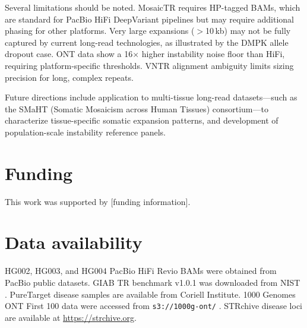 \documentclass[12pt]{article}
\begin{document}
Several limitations should be noted.
MosaicTR requires HP-tagged BAMs, which are standard for PacBio HiFi DeepVariant pipelines but may require additional phasing for other platforms.
Very large expansions ($>$10\,kb) may not be fully captured by current long-read technologies, as illustrated by the DMPK allele dropout case.
ONT data show a 16$\times$ higher instability noise floor than HiFi, requiring platform-specific thresholds.
VNTR alignment ambiguity limits sizing precision for long, complex repeats.

Future directions include application to multi-tissue long-read datasets---such as the SMaHT (Somatic Mosaicism across Human Tissues) consortium---to characterize tissue-specific somatic expansion patterns, and development of population-scale instability reference panels.

\section*{Funding}

This work was supported by [funding information].

\section*{Data availability}

HG002, HG003, and HG004 PacBio HiFi Revio BAMs were obtained from PacBio public datasets.
GIAB TR benchmark v1.0.1 was downloaded from NIST \citep{english2024}.
PureTarget disease samples are available from Coriell Institute.
1000 Genomes ONT First 100 data were accessed from \texttt{s3://1000g-ont/} \citep{gustafson2024}.
STRchive disease loci are available at \url{https://strchive.org}.

\end{document}
